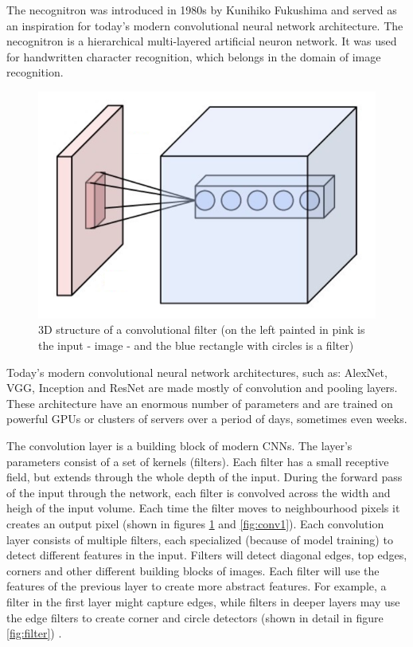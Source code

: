 \documentclass[times, utf8, diplomski]{fer}
\begin{document}
The necognitron was introduced in 1980s by Kunihiko Fukushima \citep{fukushima_neocognitron:_1982, eckmiller_hierarchical_1989} and served as an inspiration for today's modern convolutional neural network architecture. The necognitron is a hierarchical multi-layered artificial neuron network. It was used for handwritten character recognition, which belongs in the domain of image recognition.

\begin{figure}
  \includegraphics[scale=0.5]{figures/conv.png}
  \centering
  \caption{3D structure of a convolutional filter (on the left painted in pink is the input - image - and the blue rectangle with circles is a filter)}
  \label{fig:conv}
\end{figure}

Today's modern convolutional neural network architectures, such as: AlexNet, VGG, Inception and ResNet \citep{krizhevsky_imagenet_2012, simonyan_very_2014, szegedy_going_2015, he_deep_2016} are made mostly of convolution and pooling layers. These architecture have an enormous number of parameters and are trained on powerful GPUs or clusters of servers over a period of days, sometimes even weeks.

The convolution layer is a building block of modern CNNs. The layer's parameters consist of a set of kernels (filters). Each filter has a small receptive field, but extends through the whole depth of the input. During the forward pass of the input through the network, each filter is convolved across the width and heigh of the input volume. Each time the filter moves to neighbourhood pixels it creates an output pixel (shown in figures \ref{fig:conv} and \ref{fig:conv1}). Each convolution layer consists of multiple filters, each specialized (because of model training) to detect different features in the input. Filters will detect diagonal edges, top edges, corners and other different building blocks of images. Each filter will use the features of the previous layer to create more abstract features. For example, a filter in the first layer might capture edges, while filters in deeper layers may use the edge filters to create corner and circle detectors (shown in detail in figure \ref{fig:filter}) \citep{simonyan_very_2014}.
\end{document}
